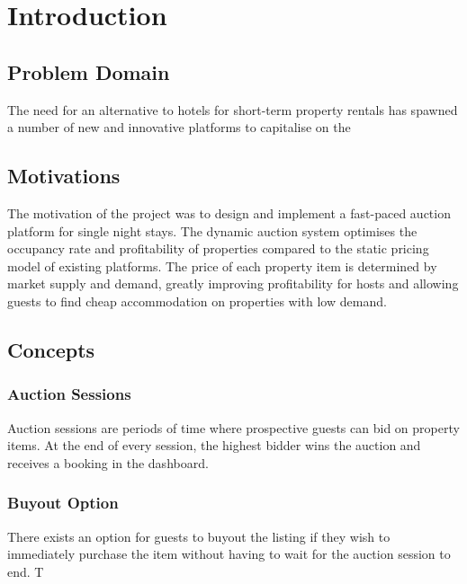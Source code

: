 \section{Introduction}

\subsection{Problem Domain}

The need for an alternative to hotels for short-term property rentals has spawned
a number of new and innovative platforms to capitalise on the

\subsection{Motivations}
The motivation of the project was to design and implement a fast-paced auction
platform for single night stays. The dynamic auction system optimises the occupancy
rate and profitability of properties compared to the static pricing
model of existing platforms. The price of each property item is determined
by market supply and demand, greatly improving profitability for hosts and
allowing guests to find cheap accommodation on properties with low demand.

\subsection{Concepts}

\subsubsection{Auction Sessions}
Auction sessions are periods of time where prospective guests can bid on property items.
At the end of every session, the highest bidder wins the auction and receives a booking
in the dashboard.

\subsubsection{Buyout Option}
There exists an option for guests to buyout the listing if they wish to immediately purchase
the item without having to wait for the auction session to end. T
